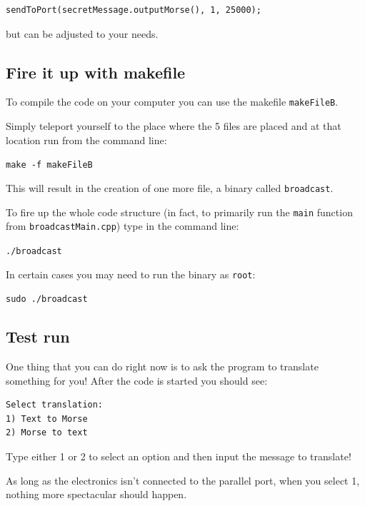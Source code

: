 \documentclass[12pt]{report}
\begin{document}
\begin{lstlisting}
sendToPort(secretMessage.outputMorse(), 1, 25000);
\end{lstlisting}

but can be adjusted to your needs.

\subsection{Fire it up with makefile}

To compile the code on your computer you can use the makefile \verb|makeFileB|.

Simply teleport yourself to the place where the 5 files are placed and at that location run from the command line:

\begin{snugshade}
\verb|make -f makeFileB|
\end{snugshade}

This will result in the creation of one more file, a binary called \verb|broadcast|.

To fire up the whole code structure (in fact, to primarily run the \verb|main| function from \verb|broadcastMain.cpp|) type in the command line:

\begin{snugshade}
\verb|./broadcast|
\end{snugshade}


In certain cases you may need to run the binary as \verb|root|:

\begin{snugshade}
\verb|sudo ./broadcast|
\end{snugshade}

\subsection{Test run}

One thing that you can do right now is to ask the program to translate something for you! After the code is started you should see:

\begin{snugshade}
\begin{verbatim}
Select translation:
1) Text to Morse
2) Morse to text
\end{verbatim}
\end{snugshade}

Type either 1 or 2 to select an option and then input the message to translate!

As long as the electronics isn't connected to the parallel port, when you select 1, nothing more spectacular should happen.
\end{document}

